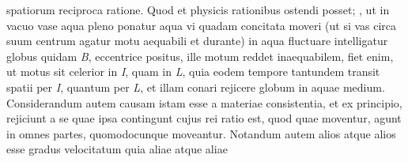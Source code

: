                   spatiorum reciproca ratione. Quod et physicis rationibus ostendi posset; ,  ut in vacuo vase aqua pleno  ponatur aqua vi quadam concitata moveri 
                                    (ut si vas circa suum centrum agatur motu aequabili\protect{} et durante) in aqua fluctuare intelligatur globus quidam \textit{B}, eccentrice positus, ille motum reddet inaequabilem, fiet enim, ut motus sit celerior in \textit{I}, quam in \textit{L}, quia eodem tempore tantundem transit spatii per \textit{I}, quantum per \textit{L}, et  illam conari rejicere globum in aquae medium. Considerandum autem causam istam esse a materiae consistentia, et ex principio,  rejiciunt a se quae ipsa contingunt cujus rei ratio est, quod quae moventur, agunt in omnes partes, quomodocunque moveantur. Notandum autem alios atque alios esse gradus velocitatum\protect{} quia aliae atque aliae 